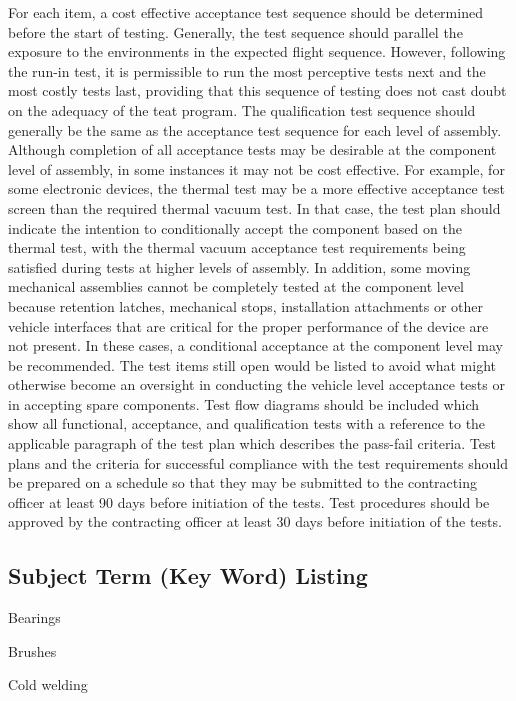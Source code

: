 \documentclass[12pt]{article}
\begin{document}
For each item, a cost effective acceptance test sequence should be determined before the start of testing. 
Generally, the test sequence should parallel the exposure to the environments in the expected flight sequence. 
However, following the run-in test, it is permissible to run the most perceptive tests next and the most costly tests last, providing that this sequence of testing does not cast doubt on the adequacy of the teat program. 
The qualification test sequence should generally be the same as the acceptance test sequence for each level of assembly. 
Although completion of all acceptance tests may be desirable at the component level of assembly, in some instances it may not be cost effective.
For example, for some electronic devices, the thermal test may be a more effective acceptance test screen than the required thermal vacuum test. 
In that case, the test plan should indicate the intention to conditionally accept the component based on the thermal test, with the thermal vacuum acceptance test requirements being satisfied during tests at higher levels of assembly. 
In addition, some moving mechanical assemblies cannot be completely tested at the component level because retention latches, mechanical stops, installation attachments or other vehicle interfaces that are critical for the proper performance of the device are not present. 
In these cases, a conditional acceptance at the component level may be recommended. 
The test items still open would be listed to avoid what might otherwise become an oversight in conducting the vehicle level acceptance tests or in accepting spare components. 
Test flow diagrams should be included which show all functional, acceptance, and qualification tests with a reference to the applicable paragraph of the test plan which describes the pass-fail criteria. 
Test plans and the criteria for successful compliance with the test requirements should be prepared on a schedule so that they may be submitted to the contracting officer at least 90 days before initiation of the tests. 
Test procedures should be approved by the contracting officer at least 30 days before initiation of the tests.

\clearpage
\subsection{Subject Term (Key Word) Listing} %

Bearings

Brushes

Cold welding
\end{document}

